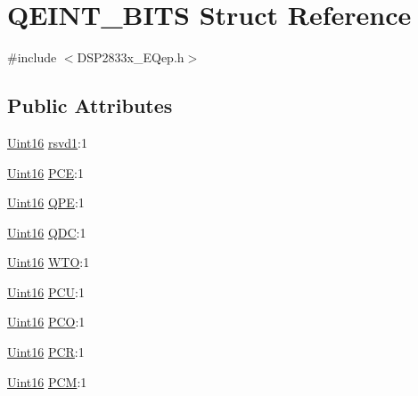 \hypertarget{struct_q_e_i_n_t___b_i_t_s}{}\section{Q\+E\+I\+N\+T\+\_\+\+B\+I\+T\+S Struct Reference}
\label{struct_q_e_i_n_t___b_i_t_s}


{\ttfamily \#include $<$D\+S\+P2833x\+\_\+\+E\+Qep.\+h$>$}

\subsection*{Public Attributes}
\begin{DoxyCompactItemize}
\item 
\hyperlink{_d_s_p2833x___device_8h_a59a9f6be4562c327cbfb4f7e8e18f08b}{Uint16} \hyperlink{struct_q_e_i_n_t___b_i_t_s_abe715b63fbc4566a0c29a163bede0173}{rsvd1}\+:1
\item 
\hyperlink{_d_s_p2833x___device_8h_a59a9f6be4562c327cbfb4f7e8e18f08b}{Uint16} \hyperlink{struct_q_e_i_n_t___b_i_t_s_a5db62f424c4fde37d59384958ffe227e}{P\+C\+E}\+:1
\item 
\hyperlink{_d_s_p2833x___device_8h_a59a9f6be4562c327cbfb4f7e8e18f08b}{Uint16} \hyperlink{struct_q_e_i_n_t___b_i_t_s_aecdf89c186b2ab4deb1d7cfa082f0931}{Q\+P\+E}\+:1
\item 
\hyperlink{_d_s_p2833x___device_8h_a59a9f6be4562c327cbfb4f7e8e18f08b}{Uint16} \hyperlink{struct_q_e_i_n_t___b_i_t_s_a3a85f2c9aa910e621c320db39525e9ce}{Q\+D\+C}\+:1
\item 
\hyperlink{_d_s_p2833x___device_8h_a59a9f6be4562c327cbfb4f7e8e18f08b}{Uint16} \hyperlink{struct_q_e_i_n_t___b_i_t_s_a01c31e270088664ce3f3faa43990538a}{W\+T\+O}\+:1
\item 
\hyperlink{_d_s_p2833x___device_8h_a59a9f6be4562c327cbfb4f7e8e18f08b}{Uint16} \hyperlink{struct_q_e_i_n_t___b_i_t_s_a91bb412ee07bc4721cda1b575f8ced04}{P\+C\+U}\+:1
\item 
\hyperlink{_d_s_p2833x___device_8h_a59a9f6be4562c327cbfb4f7e8e18f08b}{Uint16} \hyperlink{struct_q_e_i_n_t___b_i_t_s_a7eebcf9be73ca6f8f5b2e94b18b67eae}{P\+C\+O}\+:1
\item 
\hyperlink{_d_s_p2833x___device_8h_a59a9f6be4562c327cbfb4f7e8e18f08b}{Uint16} \hyperlink{struct_q_e_i_n_t___b_i_t_s_a348de8d77918aa290d14a2f919668fd5}{P\+C\+R}\+:1
\item 
\hyperlink{_d_s_p2833x___device_8h_a59a9f6be4562c327cbfb4f7e8e18f08b}{Uint16} \hyperlink{struct_q_e_i_n_t___b_i_t_s_a01e22f32cc1085eb10a0b6f7926338a7}{P\+C\+M}\+:1

\end{DoxyCompactItemize}
